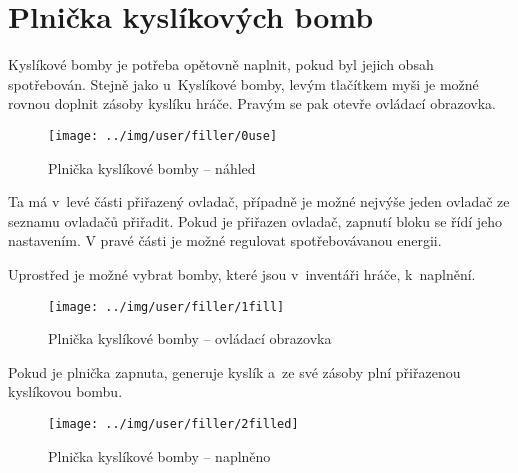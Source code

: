 
\section{Plnička kyslíkových bomb}

Kyslíkové bomby je potřeba opětovně naplnit, pokud byl jejich obsah spotřebován. Stejně jako u~Kyslíkové bomby, levým tlačítkem myši je možné rovnou doplnit zásoby kyslíku hráče. Pravým se pak otevře ovládací obrazovka.

\begin{figure}[!ht]\centering
\texttt{[image: ../img/user/filler/0use]}

\caption{Plnička kyslíkové bomby -- náhled}
\label{fig:user_filler_0use}

\end{figure}

\FloatBarrier

Ta má v~levé části přiřazený ovladač, případně je možné nejvýše jeden ovladač ze seznamu ovladačů přiřadit. Pokud je přiřazen ovladač, zapnutí bloku se řídí jeho nastavením. V pravé části je možné regulovat spotřebovávanou energii.

Uprostřed je možné vybrat bomby, které jsou v~inventáři hráče, k~naplnění.

\begin{figure}[!ht]\centering
\texttt{[image: ../img/user/filler/1fill]}

\caption{Plnička kyslíkové bomby -- ovládací obrazovka}
\label{fig:user_filler_1fill}

\end{figure}

\FloatBarrier

Pokud je plnička zapnuta, generuje kyslík a~ze své zásoby plní přiřazenou kyslíkovou bombu.

\begin{figure}[!ht]\centering
\texttt{[image: ../img/user/filler/2filled]}

\caption{Plnička kyslíkové bomby -- naplněno}
\label{fig:user_filler_2filled}

\end{figure}



\FloatBarrier